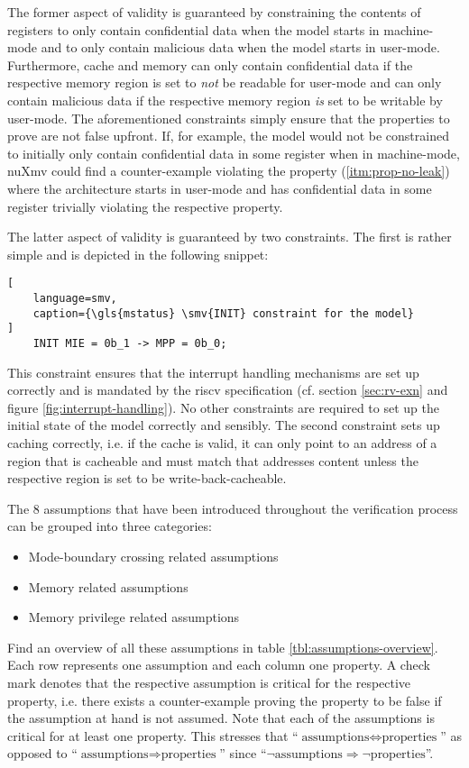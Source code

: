 The former aspect of validity is guaranteed by constraining the contents of registers to only contain confidential data when the model starts in machine-mode and to only contain malicious data when the model starts in user-mode.
Furthermore, cache and memory can only contain confidential data if the respective memory region is set to \textit{not} be readable for user-mode and can only contain malicious data if the respective memory region \textit{is} set to be writable by user-mode.
The aforementioned  constraints simply ensure that the properties to prove are not false upfront.
If, for example, the model would not be constrained to initially only contain confidential data in some register when in machine-mode, nuXmv could find a counter-example violating the  property (\ref{itm:prop-no-leak}) where the architecture starts in user-mode and has confidential data in some register trivially violating the respective property.

The latter aspect of validity is guaranteed by two constraints.
The first is rather simple and is depicted in the following snippet:
\begin{lstlisting}[
    language=smv,
    caption={\gls{mstatus} \smv{INIT} constraint for the model}
]
    INIT MIE = 0b_1 -> MPP = 0b_0;
\end{lstlisting}
This constraint ensures that the interrupt handling mechanisms are set up correctly and is mandated by the \gls{riscv} specification (cf. section \ref{sec:rv-exn} and figure \ref{fig:interrupt-handling}).
No other  constraints are required to set up the initial state of the model correctly and sensibly.
The second constraint sets up caching correctly, i.e. if the cache is valid, it can only point to an address of a region that is cacheable and must match that addresses content unless the respective region is set to be write-back-cacheable.

The 8 assumptions that have been introduced throughout the verification process can be grouped into three categories:
\begin{itemize}
    \item Mode-boundary crossing related assumptions
    \item Memory related assumptions
    \item Memory privilege related assumptions
\end{itemize}

Find an overview of all these assumptions in table \ref{tbl:assumptions-overview}.
Each row represents one assumption and each column one property.
A check mark denotes that the respective assumption is critical for the respective property, i.e. there exists a counter-example proving the property to be false if the assumption at hand is not assumed.
Note that each of the assumptions is critical for at least one property.
This stresses that \enquote{$ \text{assumptions} \Leftrightarrow \text{properties} $} as opposed to \enquote{$ \text{assumptions} \Rightarrow \text{properties} $} since \enquote{$ \neg \text{assumptions} \Rightarrow \neg \text{properties} $}.

